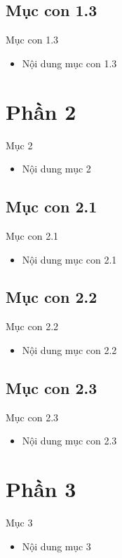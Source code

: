 \documentclass{beamer}
\begin{document}
\subsection{Mục con 1.3}
\begin{frame}{Mục con 1.3}
\begin{itemize}
\item Nội dung mục con 1.3
\end{itemize}
\end{frame}

\section{Phần 2}
\begin{frame}{Mục 2}
\begin{itemize}
\item Nội dung mục 2
\end{itemize}
\end{frame}

\subsection{Mục con 2.1}
\begin{frame}{Mục con 2.1}
\begin{itemize}
\item Nội dung mục con 2.1
\end{itemize}
\end{frame}

\subsection{Mục con 2.2}
\begin{frame}{Mục con 2.2}
\begin{itemize}
\item Nội dung mục con 2.2
\end{itemize}
\end{frame}

\subsection{Mục con 2.3}
\begin{frame}{Mục con 2.3}
\begin{itemize}
\item Nội dung mục con 2.3
\end{itemize}
\end{frame}

\section{Phần 3}
\begin{frame}{Mục 3}
\begin{itemize}
\item Nội dung mục 3
\end{itemize}
\end{frame}
\end{document}
